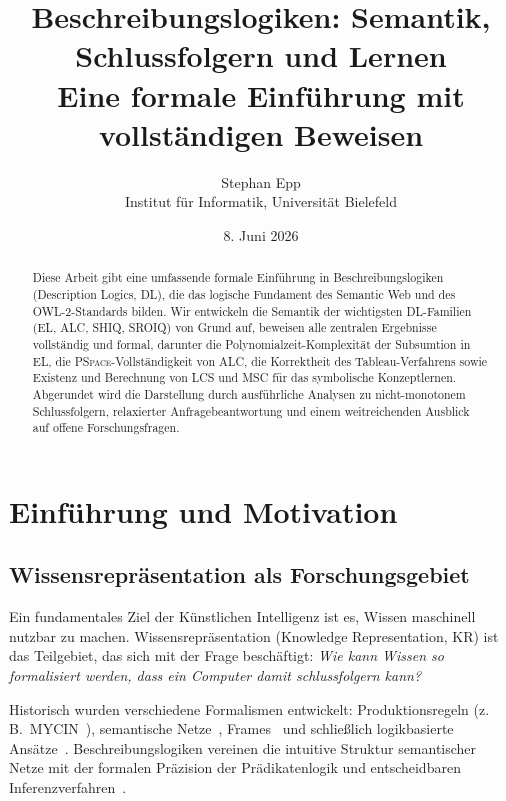 ﻿\documentclass[a4paper,12pt]{article}
\title{\textbf{Beschreibungslogiken: Semantik, Schlussfolgern und Lernen}\\
\large Eine formale Einf{\"{u}}hrung mit vollst{\"{a}}ndigen Beweisen}
\author{Stephan Epp\\
Institut f{\"{u}}r Informatik, Universit{\"{a}}t Bielefeld}
\date{8. Juni 2026}
\theoremstyle{definition}
\theoremstyle{plain}
\theoremstyle{remark}
\begin{document}
\maketitle

\begin{abstract}
Diese Arbeit gibt eine umfassende formale Einf{\"{u}}hrung in Beschreibungslogiken
(Description Logics, DL), die das logische Fundament des Semantic Web
und des OWL-2-Standards bilden.
Wir entwickeln die Semantik der wichtigsten DL-Familien
(\textsf{EL}, \textsf{ALC}, \textsf{SHIQ}, \textsf{SROIQ})
von Grund auf, beweisen alle zentralen Ergebnisse vollst{\"{a}}ndig und formal,
darunter die Polynomialzeit-Komplexit{\"{a}}t der Subsumtion in \textsf{EL},
die \textsc{PSpace}-Vollst{\"{a}}ndigkeit von \textsf{ALC},
die Korrektheit des Tableau-Verfahrens sowie Existenz und Berechnung
von LCS und MSC f{\"{u}}r das symbolische Konzeptlernen.
Abgerundet wird die Darstellung durch ausf{\"{u}}hrliche Analysen zu
nicht-monotonem Schlussfolgern, relaxierter Anfragebeantwortung und
einem weitreichenden Ausblick auf offene Forschungsfragen.
\end{abstract}

\tableofcontents
\newpage

\section{Einf{\"{u}}hrung und Motivation}

\subsection{Wissensrepr{\"{a}}sentation als Forschungsgebiet}

Ein fundamentales Ziel der K{\"{u}}nstlichen Intelligenz ist es, Wissen
maschinell nutzbar zu machen. Wissensrepr{\"{a}}sentation (Knowledge
Representation, KR) ist das Teilgebiet, das sich mit der Frage
besch{\"{a}}ftigt: \emph{Wie kann Wissen so formalisiert werden, dass ein
Computer damit schlussfolgern kann?}

Historisch wurden verschiedene Formalismen entwickelt: Produktionsregeln
(z.\,B.\ MYCIN~\cite{Buchanan1984}), semantische Netze~\cite{Quillian1968},
Frames~\cite{Minsky1975} und schlie{\ss}lich
logikbasierte Ans{\"{a}}tze~\cite{McCarthy1963}. Beschreibungslogiken
vereinen die intuitive Struktur semantischer Netze mit der
formalen Pr{\"{a}}zision der Pr{\"{a}}dikatenlogik und entscheidbaren
Inferenzverfahren~\cite{Baader2007}.
\end{document}
